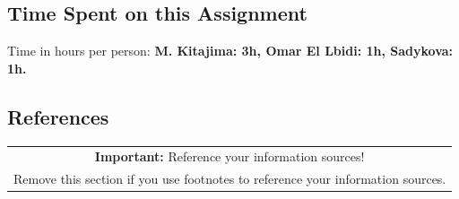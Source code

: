 \documentclass[11pt]{scrartcl}
\begin{document}
\subsection*{Time Spent on this Assignment}

Time in hours per person: \textbf{M. Kitajima: 3h, Omar El Lbidi: 1h, Sadykova: 1h. }

\subsection*{References}

\begin{table}[H]
  \centering
  \begin{tabular}{c}
    \hline
    \textbf{Important:} Reference your information sources! \tabularnewline
    Remove this section if you use footnotes to reference your information sources. \tabularnewline
    \hline
  \end{tabular}
\end{table}
\end{document}
